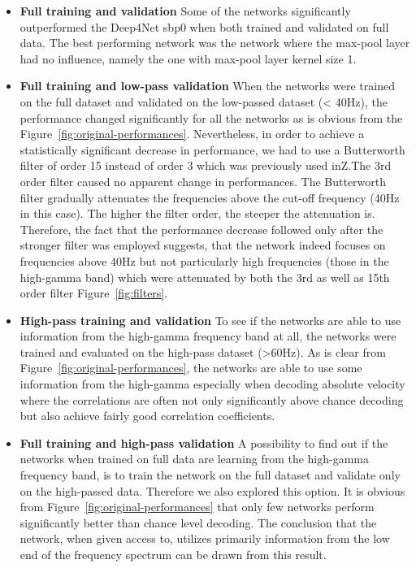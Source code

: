 \begin{itemize}
    \item \textbf{Full training and validation} Some of the networks significantly outperformed the Deep4Net sbp0 when both trained and validated on full data. The best performing network was the network where the max-pool layer had no influence, namely the one with max-pool layer kernel size 1.
    \item \textbf{Full training and low-pass validation} When the networks were trained on the full dataset and validated on the low-passed dataset (< 40Hz), the performance changed significantly for all the networks as is obvious from the Figure~\ref{fig:original-performances}.
    Nevertheless, in order to achieve a statistically significant decrease in performance, we had to use a Butterworth filter of order 15 instead of order 3 which was previously used inZ\cite{Hammer-2021}.The 3rd order filter caused no apparent change in performances.
    The Butterworth filter gradually attenuates the frequencies above the cut-off frequency (40Hz in this case).
    The higher the filter order, the steeper the attenuation is.
    Therefore, the fact that the performance decrease followed only after the stronger filter was employed suggests, that the network indeed focuses on frequencies above 40Hz but not particularly high frequencies (those in the high-gamma band) which were attenuated by both the 3rd as well as 15th order filter Figure~\ref{fig:filters}.
    \item \textbf{High-pass training and validation} To see if the networks are able to use information from the high-gamma frequency band at all, the networks were trained and evaluated on the high-pass dataset (>60Hz).
    As is clear from Figure~\ref{fig:original-performances}, the networks are able to use some information from the high-gamma especially when decoding absolute velocity where the correlations are often not only significantly above chance decoding but also achieve fairly good correlation coefficients.
    \item \textbf{Full training and high-pass validation} A possibility to find out if the networks when trained on full data are learning from the high-gamma frequency band, is to train the network on the full dataset and validate only on the high-passed data.
    Therefore we also explored this option.
    It is obvious from Figure~\ref{fig:original-performances} that only few networks perform significantly better than chance level decoding.
    The conclusion that the network, when given access to, utilizes primarily information from the low end of the frequency spectrum can be drawn from this result.

\end{itemize}
